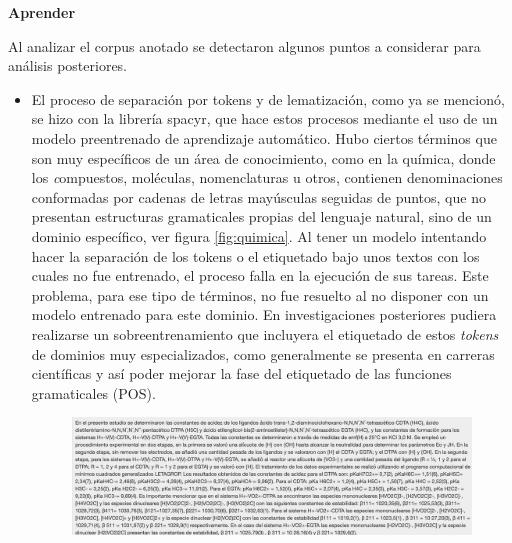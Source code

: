 \documentclass[
  12pt,
  openany]{book}
\begin{document}
\textbf{Aprender}

Al analizar el corpus anotado se detectaron algunos puntos a considerar para análisis posteriores.

\begin{itemize}
\item
  El proceso de separación por tokens y de lematización, como ya se mencionó, se hizo con la librería spacyr, que hace estos procesos mediante el uso de un modelo preentrenado de aprendizaje automático. Hubo ciertos términos que son muy específicos de un área de conocimiento, como en la química, donde los \emph{c}ompuestos, moléculas, nomenclaturas u otros, contienen denominaciones conformadas por cadenas de letras mayúsculas seguidas de puntos, que no presentan estructuras gramaticales propias del lenguaje natural, sino de un dominio específico, ver figura \ref{fig:quimica}. Al tener un modelo intentando hacer la separación de los tokens o el etiquetado bajo unos textos con los cuales no fue entrenado, el proceso falla en la ejecución de sus tareas. Este problema, para ese tipo de términos, no fue resuelto al no disponer con un modelo entrenado para este dominio. En investigaciones posteriores pudiera realizarse un sobreentrenamiento que incluyera el etiquetado de estos \emph{tokens} de dominios muy especializados, como generalmente se presenta en carreras científicas y así poder mejorar la fase del etiquetado de las funciones gramaticales (POS).

  \begin{figure}

  {\centering \includegraphics[width=0.9\linewidth]{images/05-desarrollo/2_ciclo/quimica} 

  }


\end{figure}
\end{itemize}
\end{document}
